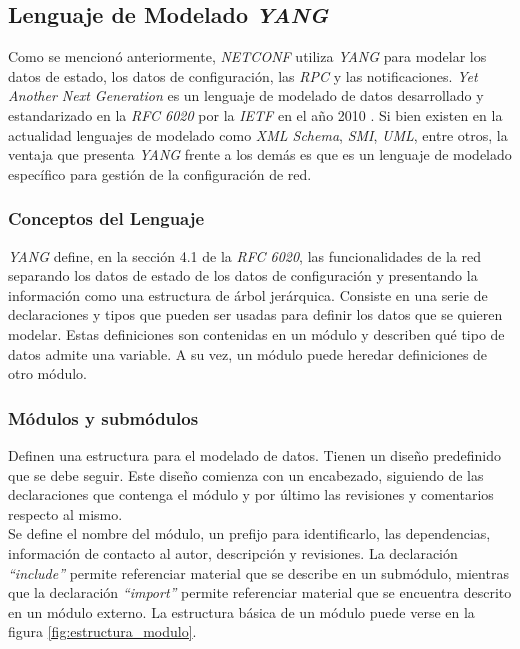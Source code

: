   \subsection{Lenguaje de Modelado \textit{YANG}}
  Como se mencionó anteriormente, \textit{NETCONF} utiliza \textit{YANG} para modelar los datos de estado, los datos de configuración, las \textit{RPC} y las notificaciones. \textit{Yet Another Next Generation} es un lenguaje de modelado de datos desarrollado y estandarizado en la \textit{RFC 6020} por la \textit{IETF} en el año 2010 \parencite{yangrfc}. Si bien existen en la actualidad lenguajes de modelado como \textit{XML Schema}, \textit{SMI}, \textit{UML}, entre otros, la ventaja que presenta \textit{YANG} frente a los demás es que es un lenguaje de modelado específico para gestión de la configuración de red.

  \subsubsection{Conceptos del Lenguaje}
  \textit{YANG} define, en la sección 4.1 de la \textit{RFC 6020}, las funcionalidades de la red separando los datos de estado de los datos de configuración y presentando la información como una estructura de árbol jerárquica. Consiste en una serie de declaraciones y tipos que pueden ser usadas para definir los datos que se quieren modelar. Estas definiciones son contenidas en un módulo y describen qué tipo de datos admite una variable. A su vez, un módulo puede heredar definiciones de otro módulo.

  \subsubsection{Módulos y submódulos}
  Definen una estructura para el modelado de datos. Tienen un diseño predefinido que se debe seguir. Este diseño comienza con un encabezado, siguiendo de las declaraciones que contenga el módulo y por último las revisiones y comentarios respecto al mismo. 
  \\

  Se define el nombre del módulo, un prefijo para identificarlo, las dependencias, información de contacto al autor, descripción y revisiones. La declaración \textit{“include”} permite referenciar material que se describe en un submódulo, mientras que la declaración \textit{“import”} permite referenciar material que se encuentra descrito en un módulo externo. La estructura básica de un módulo puede verse en la figura \ref{fig:estructura_modulo}.

